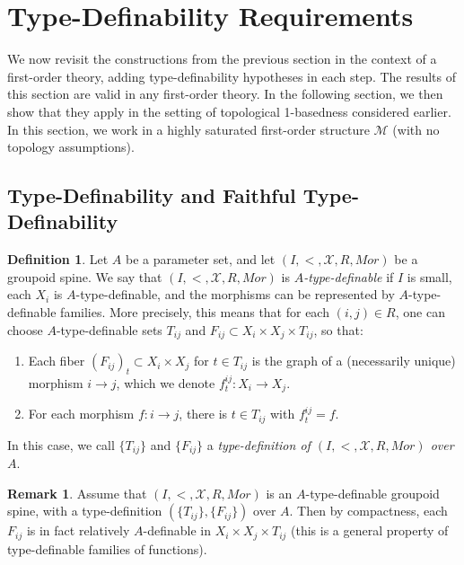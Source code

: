 \documentclass{amsart}
\theoremstyle{definition}
\newtheorem{definition}[theorem]{Definition}
\newtheorem{remark}[theorem]{Remark}
\begin{document}
\section{Type-Definability Requirements}

We now revisit the constructions from the previous section in the context of a first-order theory, adding type-definability hypotheses in each step. The results of this section are valid in any first-order theory. In the following section, we then show that they apply in the setting of topological 1-basedness considered earlier. In this section, we work in a highly saturated first-order structure $\mathcal M$ (with no topology assumptions).

\subsection{Type-Definability and Faithful Type-Definability}

\begin{definition}\label{D: weak type def}
    Let $A$ be a parameter set, and let $(I,<,\mathcal X,R,Mor)$ be a groupoid spine. We say that $(I,<,\mathcal X,R,Mor)$ is \textit{$A$-type-definable} if $I$ is small, each $X_i$ is $A$-type-definable, and the morphisms can be represented by $A$-type-definable families. More precisely, this means that for each $(i,j)\in R$, one can choose $A$-type-definable sets $T_{ij}$ and $F_{ij}\subset X_i\times X_j\times T_{ij}$, so that:
    \begin{enumerate}
        \item Each fiber $(F_{ij})_t\subset X_i\times X_j$ for $t\in T_{ij}$ is the graph of a (necessarily unique) morphism $i\rightarrow j$, which we denote $f^{ij}_t:X_i\rightarrow X_j$. 
        \item For each morphism $f:i\rightarrow j$, there is $t\in T_{ij}$ with $f^{ij}_t=f$.
    \end{enumerate}
    In this case, we call $\{T_{ij}\}$ and $\{F_{ij}\}$ a \textit{type-definition of $(I,<,\mathcal X,R,Mor)$ over $A$}.
    \end{definition}

    \begin{remark}\label{R: relatively definable} Assume that $(I,<,\mathcal X,R,Mor)$ is an $A$-type-definable groupoid spine, with a type-definition $(\{T_{ij}\},\{F_{ij}\})$ over $A$. Then by compactness, each $F_{ij}$ is in fact relatively $A$-definable in $X_i\times X_j\times T_{ij}$ (this is a general property of type-definable families of functions).
    \end{remark}
    
\end{document}
